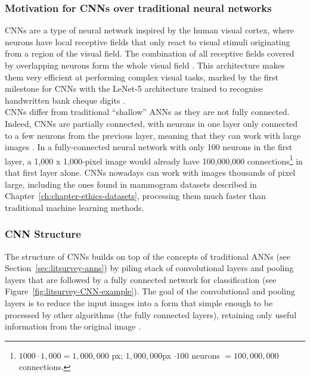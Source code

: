 \subsubsection{Motivation for CNNs over traditional neural networks}

CNNs are a type of neural network inspired by the human visual cortex, where neurons have local receptive fields that only react to visual stimuli originating from a region of the visual field. The combination of all receptive fields covered by overlapping neurons form the whole visual field \citep{Geron2019}. This architecture makes them very efficient at performing complex visual tasks, marked by the first milestone for CNNs with the LeNet-5 architecture trained to recognise handwritten bank cheque digits \citep{LeCun1998}.\\

CNNs differ from traditional ``shallow'' ANNs as they are not fully connected. Indeed, CNNs are partially connected, with neurons in one layer only connected to a few neurons from the previous layer, meaning that they can work with large images \citep{Geron2019}. In a fully-connected neural network with only 100 neurons in the first layer, a 1,000 x 1,000-pixel image would already have 100,000,000 connections\footnote{$1000 \cdot 1,000 = 1,000,000$ px; $1,000,000$px $\cdot 100$ neurons $= 100,000,000$ connections.} in that first layer alone. CNNs nowadays can work with images thousands of pixel large, including the ones found in mammogram datasets described in Chapter~\ref{ch:chapter-ethics-datasets}, processing them much faster than traditional machine learning methods.

\subsubsection{CNN Structure}

The structure of CNNs builds on top of the concepts of traditional ANNs (see Section~\ref{sec:litsurvey-anns}) by piling stack of convolutional layers and pooling layers that are followed by a fully connected network for classification (see Figure~\ref{fig:litsurvey-CNN-example}). The goal of the convolutional and pooling layers is to reduce the input images into a form that simple enough to be processed by other algorithms (the fully connected layers), retaining only useful information from the original image \citep{Shen2017}.

